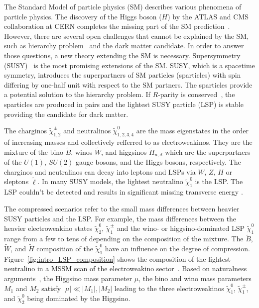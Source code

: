 The Standard Model of particle physics (SM) describes various phenomena of particle physics.
The discovery of the Higgs boson ($H$) by the ATLAS and CMS collaboration at CERN completes the missing part of the SM prediction~\cite{Aad:2012tfa, Chatrchyan:2012xdj}.
However, there are several open challenges that cannot be explained by the SM, such as hierarchy problem~\cite{Weinberg:1975gm, Gildener:1976ai, Susskind:1978ms} and the dark matter candidate.
In order to answer those questions, a new theory extending the SM is necessary.
Supersymmetry (SUSY)~\cite{Wess:1973kz, Wess:201649, Golfand:1971iw, Martin:1997ns} is the most promising extensions of the SM.
SUSY, which is a spacetime symmetry, introduces the superpartners of SM particles (sparticles) with spin differing by one-half unit with respect to the SM partners.
The sparticles provide a potential solution to the hierarchy problem.
If $R$-parity is conserved~\cite{Fayet:1976et, Fayet:1977yc, Farrar:1978xj}, the sparticles are produced in pairs and the lightest SUSY particle (LSP) is stable providing the candidate for dark matter.

The charginos $\widetilde{\chi}^{\pm}_{1,2}$ and neutralinos $\widetilde{\chi}^{0}_{1,2,3,4}$ are the mass eigenstates in the order of increasing masses and collectively refferred to as electroweakinos.
They are the mixture of the bino $\widetilde{B}$, winos $\widetilde{W}$, and higgsinos $\widetilde{H}_{u,d}$ which are the superpartners of the $U(1)$, $SU(2)$ gauge bosons, and the Higgs bosons, respectively.
The charginos and neutralinos can decay into leptons and LSPs via $W$, $Z$, $H$ or sleptons $\widetilde{\ell}$.
In many SUSY models, the lightest neutralino $\widetilde{\chi}^{0}_{1}$ is the LSP.
The LSP couldn't be detected and results in significant missing transverse energy \MET.

The compressed scenarios refer to the small mass differences between heavier SUSY particles and the LSP.
For example, the mass differences between the heavier electroweakino states $\widetilde{\chi}^{0}_{2}$, $\widetilde{\chi}^{\pm}_{1}$ and the wino- or higgsino-dominated LSP $\widetilde{\chi}^{0}_{1}$ range from a few {\MeV} to tens of {\GeV} depending on the composition of the mixture.
The $\widetilde{B}$, $\widetilde{W}$, and $\widetilde{H}$ composition of the $\widetilde{\chi}^{0}_{1}$ have an influence on the degree of compression.
Figure~\ref{fig:intro_LSP_composition} shows the composition of the lightest neutralino in a MSSM scan of the electroweakino sector~\cite{Aaboud:2016wna}.
Based on naturalness arguments~\cite{Barbieri:1987fn, deCarlos:1993rbr}, the Higgsino mass parameter $\mu$, the bino and wino mass parameters $M_{1}$ and $M_{2}$ satisfy $|\mu| \ll |M_{1}|, |M_{2}|$ leading to the three electroweakinos $\widetilde{\chi}^{0}_{1}$, $\widetilde{\chi}^{\pm}_{1}$, and $\widetilde{\chi}^{0}_{2}$ being dominated by the Higgsino.

